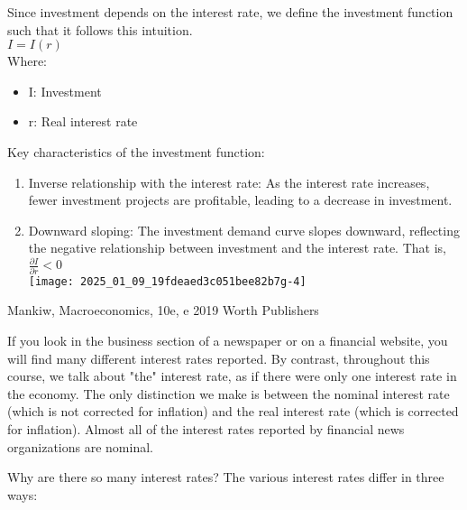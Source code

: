 \documentclass[10pt]{article}
\begin{document}
Since investment depends on the interest rate, we define the investment function such that it follows this intuition.\\
$I=I(r)$\\
Where:

\begin{itemize}
  \item I: Investment
  \item r: Real interest rate
\end{itemize}

Key characteristics of the investment function:

\begin{enumerate}
  \item Inverse relationship with the interest rate: As the interest rate increases, fewer investment projects are profitable, leading to a decrease in investment.
  \item Downward sloping: The investment demand curve slopes downward, reflecting the negative relationship between investment and the interest rate. That is, $\frac{\partial I}{\partial r}<0$\\
\texttt{[image: 2025\_01\_09\_19fdeaed3c051bee82b7g-4]}
\end{enumerate}

Mankiw, Macroeconomics, 10e, e 2019 Worth Publishers

If you look in the business section of a newspaper or on a financial website, you will find many different interest rates reported. By contrast, throughout this course, we talk about "the" interest rate, as if there were only one interest rate in the economy. The only distinction we make is between the nominal interest rate (which is not corrected for inflation) and the real interest rate (which is corrected for inflation). Almost all of the interest rates reported by financial news organizations are nominal.

Why are there so many interest rates? The various interest rates differ in three ways:
\end{document}
